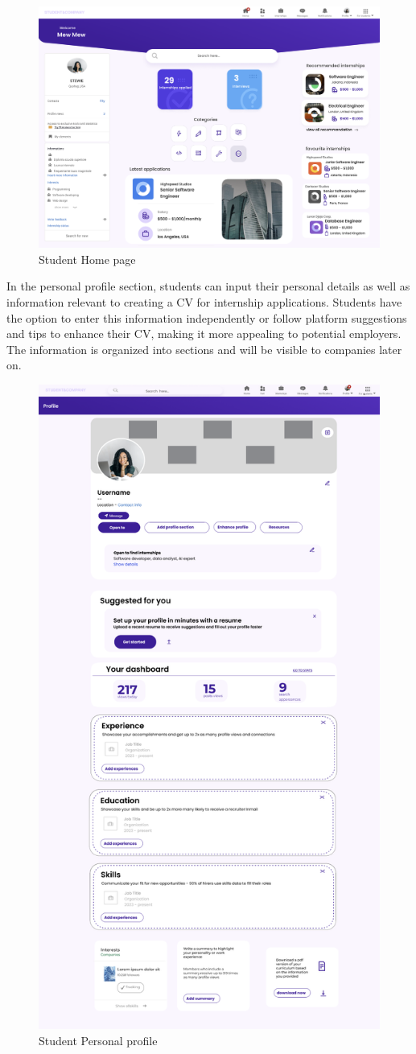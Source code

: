 \begin{figure} [H]
    \centering
    \includegraphics[width=0.5\linewidth]{Interface Images/student interface/Screenshot 2024-12-12 045307.png}
    \caption{Student Home page}
    \label{fig:Student Home page}
\end{figure}

In the personal profile section, students can input their personal details as well as information relevant to creating a CV for internship applications. Students have the option to enter this information independently or follow platform suggestions and tips to enhance their CV, making it more appealing to potential employers. The information is organized into sections and will be visible to companies later on.

\begin{figure} [H]
    \centering
    \includegraphics[width=0.5\linewidth]{Interface Images/student interface/Screenshot 2024-12-12 045421.png}
    \caption{Student Personal profile}
    \label{fig:Student Personal profile}
\end{figure}

